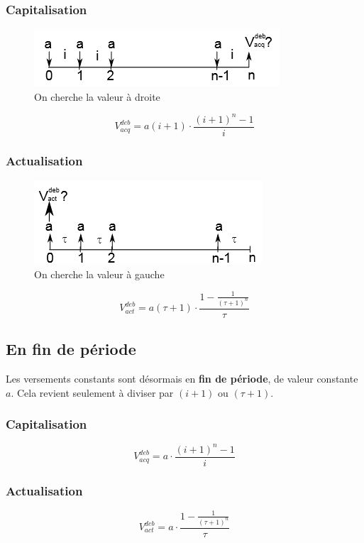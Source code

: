 \documentclass{article}
\begin{document}
\subsubsection{Capitalisation}

\begin{figure}[H]
    \centering
    \includegraphics{versement-constant.png}
    \\On cherche la valeur à droite
\end{figure}

$$\boxed{V^{deb}_{acq} = a(i+1)\cdot\dfrac{(i+1)^n-1}{i}}$$

\subsubsection{Actualisation}

\begin{figure}[H]
    \centering
    \includegraphics{versement-constant-actu.png}
    \\On cherche la valeur à gauche
\end{figure}

$$\boxed{V^{deb}_{act} = a(\tau+1)\cdot\dfrac{1-\frac{1}{(\tau+1)^n}}{\tau}}$$


\subsection{En fin de période}
Les versements constants sont désormais en \textbf{fin de période}, de valeur constante $a$.
Cela revient seulement à diviser par $(i+1)$ ou $(\tau + 1)$.

\subsubsection{Capitalisation}
$$V^{deb}_{acq} = a\cdot\dfrac{(i+1)^n-1}{i}$$

\subsubsection{Actualisation}
$$V^{deb}_{act} = a\cdot\dfrac{1-\frac{1}{(\tau+1)^n}}{\tau}$$
\end{document}
